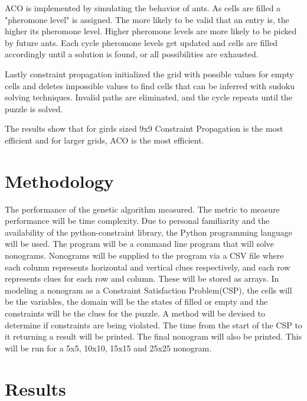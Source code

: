 \documentclass[12pt, letterpaper]
{article}
\begin{document}
    ACO is implemented by simulating the behavior of ants. As cells are filled a "pheromone level" is assigned. The more likely to be valid that an entry is, the higher its pheromone level. Higher pheromone levels are more likely to be picked by future ants. Each cycle pheromone levels get updated and cells are filled accordingly until a solution is found, or all possibilities are exhausted.

    Lastly constraint propagation initialized the grid with possible values for empty cells and deletes impossible values to find cells that can be inferred with sudoku solving techniques. Invalid paths are eliminated, and the cycle repeats until the puzzle is solved.

    The results show that for girds sized 9x9 Constraint Propagation is the most efficient and for larger grids, ACO is the most efficient.

\section{Methodology}
The performance of the genetic algorithm measured. The metric to measure performance will be time complexity. Due to personal familiarity and the availability of the python-constraint \cite{pycon} library, the Python programming language will be used. The program will be a command line program that will solve nonograms. Nonograms will be supplied to the program via a CSV file where each column represents horizontal and vertical clues respectively, and each row represents clues for each row and column. These will be stored as arrays.
In modeling a nonogram as a Constraint Satisfaction Problem(CSP), the cells will be the variables, the domain will be the states of filled or empty and the constraints will be the clues for the puzzle. A method will be devised to determine if constraints are being violated. The time from the start of the CSP to it returning a result will be printed. The final nonogram will also be printed. This will be run for a 5x5, 10x10, 15x15 and 25x25 nonogram.

\section{Results}
\end{document}
